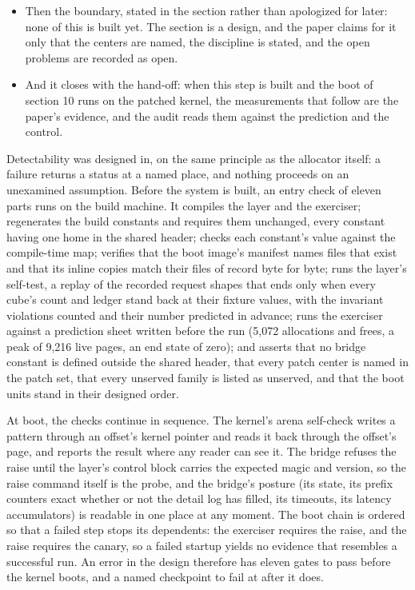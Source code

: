\documentclass[11pt]{article}
\begin{document}
\begin{itemize}
\item Then the boundary, stated in the section rather than apologized for later: none of this is built yet. The section is a design, and the paper claims for it only that the centers are named, the discipline is stated, and the open problems are recorded as open.
\item And it closes with the hand-off: when this step is built and the boot of section 10 runs on the patched kernel, the measurements that follow are the paper's evidence, and the audit reads them against the prediction and the control.
\end{itemize}

Detectability was designed in, on the same principle as the allocator itself: a failure returns a status at a named place, and nothing proceeds on an unexamined assumption. Before the system is built, an entry check of eleven parts runs on the build machine. It compiles the layer and the exerciser; regenerates the build constants and requires them unchanged, every constant having one home in the shared header; checks each constant's value against the compile-time map; verifies that the boot image's manifest names files that exist and that its inline copies match their files of record byte for byte; runs the layer's self-test, a replay of the recorded request shapes that ends only when every cube's count and ledger stand back at their fixture values, with the invariant violations counted and their number predicted in advance; runs the exerciser against a prediction sheet written before the run (5,072 allocations and frees, a peak of 9,216 live pages, an end state of zero); and asserts that no bridge constant is defined outside the shared header, that every patch center is named in the patch set, that every unserved family is listed as unserved, and that the boot units stand in their designed order.

At boot, the checks continue in sequence. The kernel's arena self-check writes a pattern through an offset's kernel pointer and reads it back through the offset's page, and reports the result where any reader can see it. The bridge refuses the raise until the layer's control block carries the expected magic and version, so the raise command itself is the probe, and the bridge's posture (its state, its prefix counters exact whether or not the detail log has filled, its timeouts, its latency accumulators) is readable in one place at any moment. The boot chain is ordered so that a failed step stops its dependents: the exerciser requires the raise, and the raise requires the canary, so a failed startup yields no evidence that resembles a successful run. An error in the design therefore has eleven gates to pass before the kernel boots, and a named checkpoint to fail at after it does.
\end{document}
